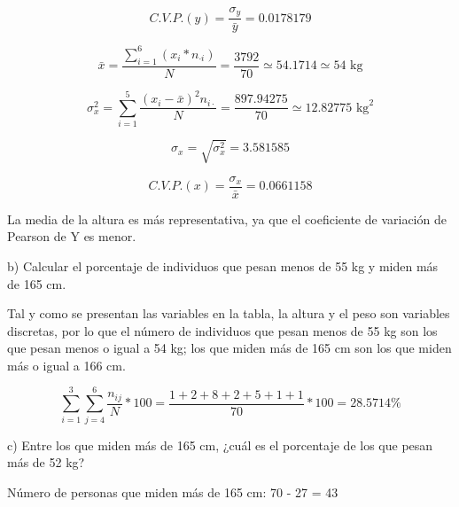 \documentclass[10pt,a4paper]{article}
\begin{document}
\begin{enumerate}
\begin{equation*}
C.V.P.(y) = \dfrac{\sigma_y}{\bar{y}} = 0.0178179
\end{equation*}

\begin{equation*}
\bar{x} = \dfrac{\displaystyle\sum_{i = 1}^6(x_{i}*n_{\cdot i})}{N} = \frac{3792}{70} \simeq 54.1714 \simeq 54 \textrm{ kg} 
\end{equation*}

\begin{equation*}
\sigma_x^2 = \displaystyle\sum_{i = 1}^5 \dfrac{(x_i - \bar{x})^2 n_{i \cdot}}{N} = \dfrac{897.94275}{70} \simeq 12.82775 \textrm{ kg}^2
\end{equation*}

\begin{equation*}
\sigma_x = \sqrt{\sigma_x^2} = 3.581585
\end{equation*}

\begin{equation*}
C.V.P.(x) = \dfrac{\sigma_x}{\bar{x}} = 0.0661158
\end{equation*}

\vspace{0.25cm} La media de la altura es más representativa, ya que el coeficiente de variación de Pearson de Y es menor.

\vspace{0.5cm}
\hspace{0.25cm} b) Calcular el porcentaje de individuos que pesan menos de 55 kg y miden más de 165 cm.

\vspace{0.5cm}
Tal y como se presentan las variables en la tabla, la altura y el peso son variables discretas, por lo que el número de individuos que pesan menos de 55 kg son los que pesan menos o igual a 54 kg; los que miden más de 165 cm son los que miden más o igual a 166 cm.

\begin{equation*}
\displaystyle\sum_{i=1}^{3} \displaystyle\sum_{j=4}^{6} \dfrac{n_{ij}}{N} * 100 = \dfrac{1+2+8+2+5+1+1}{70} * 100 = 28.5714 \%
\end{equation*}

\vspace{0.5cm}
\hspace{0.25cm} c) Entre los que miden más de 165 cm, ¿cuál es el porcentaje de los que pesan más de 52 kg?

Número de personas que miden más de 165 cm: 70 - 27 = 43


\end{enumerate}
\end{document}
